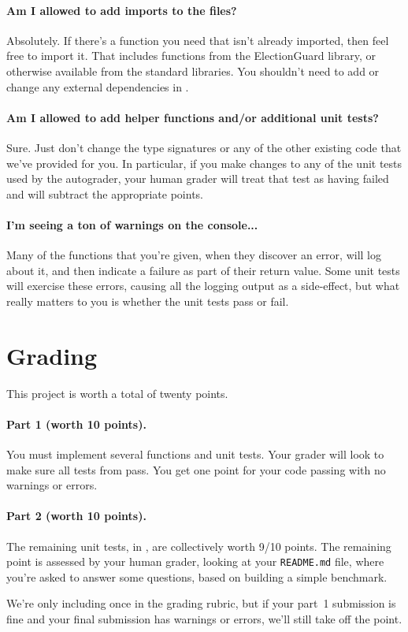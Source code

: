 \paragraph{Am I allowed to add imports to the files?} Absolutely. If
there's a function you need that isn't already imported, then feel
free to import it. That includes functions from the ElectionGuard
library, or otherwise available from the standard
 libraries.
You shouldn't need to add or change any external dependencies in
.

\paragraph{Am I allowed to add helper functions and/or additional unit
  tests?} Sure. Just don't change the type signatures or any of the
other existing code that we've provided for you. In particular,
if you make changes to any of the unit tests used by the autograder,
your human grader will treat that test as having failed and will
subtract the appropriate points.

\paragraph{I'm seeing a ton of warnings on the console...} Many of the
functions that you're given, when they discover an error, will
log about it, and then indicate a failure as part of their return
value. Some unit tests will exercise these errors, causing all
the logging output as a side-effect, but what really matters to
you is whether the unit tests pass or fail.

\section{Grading}

This project is worth a total of twenty points.

\paragraph{Part 1 (worth 10 points).} You must implement several functions and unit
tests. Your grader will look to make sure all tests from
 pass. You get one point for
your code passing 
with no warnings or errors.

\paragraph{Part 2 (worth 10 points).} The remaining unit tests, in
, are collectively worth
9/10 points. The remaining point is assessed by your human
grader, looking at your {\tt README.md} file, where you're
asked to answer some questions, based on building a simple benchmark.

We're only including  once
in the grading rubric, but if your part~1 submission is fine and your
final submission has warnings or errors, we'll still take off the point.


